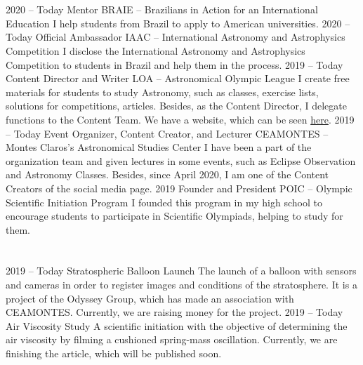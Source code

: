 \documentclass{cv}
\begin{document}
    \section*{}
        \begin{entrylist}
            \entry 
                {2020 -- Today}
                {Mentor}
                {BRAIE -- Brazilians in Action for an International Education}
                {I help students from Brazil to apply to American universities.}
            \entry
                {2020 -- Today}
                {Official Ambassador}
                {IAAC -- International Astronomy and Astrophysics Competition}
                {I disclose the International Astronomy and Astrophysics Competition to students in Brazil and help them in the process.}
            \entry
                {2019 -- Today}
                {Content Director and Writer}
                {LOA -- Astronomical Olympic League}
                {I create free materials for students to study Astronomy, such as classes, exercise lists, solutions for competitions, articles. Besides, as the Content Director, I delegate functions to the Content Team. We have a website, which can be seen \href{https://ligaolimpicadeastronomia.com.br/}{here}.}
            \entry
                {2019 -- Today}
                {Event Organizer, Content Creator, and Lecturer}
                {CEAMONTES -- Montes Claros's Astronomical Studies Center}
                {I have been a part of the organization team and given lectures in some events, such as Eclipse Observation and Astronomy Classes. Besides, since April 2020, I am one of the Content Creators of the social media page.}
            \entry
                {2019}
                {Founder and President}
                {POIC -- Olympic Scientific Initiation Program}
                {I founded this program in my high school to encourage students to participate in Scientific Olympiads, helping to study for them.}
        \end{entrylist}
    \section*{}
        \begin{entrylist}
            \entry
                {2019 -- Today}
                {Stratospheric Balloon Launch}
                {}
                {The launch of a balloon with sensors and cameras in order to register images and conditions of the stratosphere. It is a project of the Odyssey Group, which has made an association with CEAMONTES. Currently, we are raising money for the project.}
            \entry
                {2019 -- Today}
                {Air Viscosity Study}
                {}
                {A scientific initiation with the objective of determining the air viscosity by filming a cushioned spring-mass oscillation. Currently, we are finishing the article, which will be published soon.}
        \end{entrylist}
    
\end{document}
